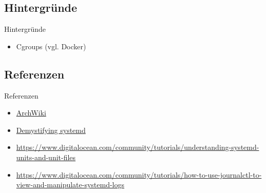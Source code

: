 \subsection{Hintergründe}

\begin{frame}{Hintergründe}
  \begin{itemize}
    \item Cgroups (vgl. Docker)
  \end{itemize}
\end{frame}

\subsection{Referenzen}

\begin{frame}{Referenzen}
\begin{itemize}	
	\item \href{https://wiki.archlinux.org/index.php/systemd}{ArchWiki}

	\item \href{https://www.redhat.com/files/summit/session-assets/2017/S103870-Demystifying-systemd.pdf}{Demystifying systemd}
	\item \href{https://www.digitalocean.com/community/tutorials/understanding-systemd-units-and-unit-files}{https://www.digitalocean.com/community/tutorials/understanding-systemd-units-and-unit-files}

	\item \href{https://www.digitalocean.com/community/tutorials/how-to-use-journalctl-to-view-and-manipulate-systemd-logs}{https://www.digitalocean.com/community/tutorials/how-to-use-journalctl-to-view-and-manipulate-systemd-logs}
\end{itemize}
\end{frame}



